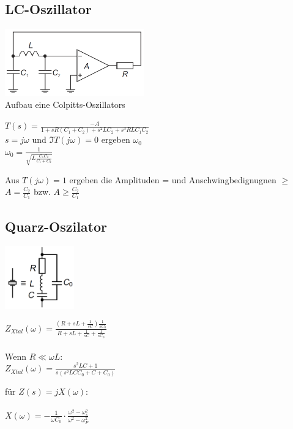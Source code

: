 \subsection{LC-Oszillator}
	\begin{multicols}{3}
		\includegraphics[width=6cm]{images/osziLC.png}\\
		Aufbau eine Colpitts-Oszillators
		\columnbreak
		
		$T\left(s\right)=\frac{-A}{1+sR\left(C_1+C_2\right)+s^2LC_2+s^3RLC_1C_2}$\\
		$s=j\omega$ und $\Im{T\left(j\omega\right)}=0$ ergeben $\omega_0$\\
		$\omega_0=\frac{1}{\sqrt{L\frac{C_1 C_2}{C_1+C_2}}}$\\
		\columnbreak
		
		Aus $T\left(j\omega\right)=1$ ergeben die Amplituden = und Anschwingbedignugnen
		$\geq$
		$A=\frac{C_2}{C_1}$ bzw. $A\geq\frac{C_2}{C_1}$
	\end{multicols}
\subsection{Quarz-Oszilator}
	\begin{multicols}{3}
		\includegraphics[width=3cm]{images/osziCrystal.png}
		\columnbreak
		
		$Z_{Xtal}\left(\omega\right)=\frac{\left(R+sL+\frac{1}{sC}\right)\frac{1}{sC_0}}{R+sL+\frac{1}{sC}+\frac{1}{sC_0}}$\\
		\\
		Wenn $R \ll \omega L$:\\
		$Z_{Xtal}\left(\omega\right)=\frac{s^2LC+1}{s\left(s^2LCC_0+C+C_0\right)}$\\
		\columnbreak
		
		f\"ur $Z\left(s\right)=jX\left(\omega\right)$:\\
		\\
		$X\left(\omega\right)=-\frac{1}{\omega C_0}\cdot \frac{\omega^2 -
		\omega_s^2}{\omega^2-\omega^2_P}$
	\end{multicols}